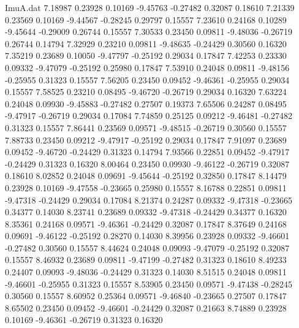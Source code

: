 \begin{filecontents}{ImuA.dat}
   7.18987    0.23928    0.10169   -9.45763   -0.27482    0.32087    0.18610
   7.21339    0.23569    0.10169   -9.44567   -0.28245    0.29797    0.15557
   7.23610    0.24168    0.10289   -9.45644   -0.29009    0.26744    0.15557
   7.30533    0.23450    0.09811   -9.48036   -0.26719    0.26744    0.14794
   7.32929    0.23210    0.09811   -9.48635   -0.24429    0.30560    0.16320
   7.35219    0.23689    0.10050   -9.47797   -0.25192    0.29034    0.17847
   7.42253    0.23330    0.09332   -9.47079   -0.25192    0.25980    0.17847
   7.53910    0.24048    0.09811   -9.48156   -0.25955    0.31323    0.15557
   7.56205    0.23450    0.09452   -9.46361   -0.25955    0.29034    0.15557
   7.58525    0.23210    0.08495   -9.46720   -0.26719    0.29034    0.16320
   7.63224    0.24048    0.09930   -9.45883   -0.27482    0.27507    0.19373
   7.65506    0.24287    0.08495   -9.47917   -0.26719    0.29034    0.17084
   7.74859    0.25125    0.09212   -9.46481   -0.27482    0.31323    0.15557
   7.86441    0.23569    0.09571   -9.48515   -0.26719    0.30560    0.15557
   7.88733    0.23450    0.09212   -9.47917   -0.25192    0.29034    0.17847
   7.91097    0.23689    0.09452   -9.46720   -0.24429    0.31323    0.14794
   7.93566    0.22851    0.09452   -9.47917   -0.24429    0.31323    0.16320
   8.00464    0.23450    0.09930   -9.46122   -0.26719    0.32087    0.18610
   8.02852    0.24048    0.09691   -9.45644   -0.25192    0.32850    0.17847
   8.14479    0.23928    0.10169   -9.47558   -0.23665    0.25980    0.15557
   8.16788    0.22851    0.09811   -9.47318   -0.24429    0.29034    0.17084
   8.21374    0.24287    0.09332   -9.47318   -0.23665    0.34377    0.14030
   8.23741    0.23689    0.09332   -9.47318   -0.24429    0.34377    0.16320
   8.35361    0.24168    0.09571   -9.46361   -0.24429    0.32087    0.17847
   8.37649    0.24168    0.09691   -9.46122   -0.25192    0.28270    0.14030
   8.39956    0.23928    0.09332   -9.46601   -0.27482    0.30560    0.15557
   8.44624    0.24048    0.09093   -9.47079   -0.25192    0.32087    0.15557
   8.46932    0.23689    0.09811   -9.47199   -0.27482    0.31323    0.18610
   8.49233    0.24407    0.09093   -9.48036   -0.24429    0.31323    0.14030
   8.51515    0.24048    0.09811   -9.46601   -0.25955    0.31323    0.15557
   8.53905    0.23450    0.09571   -9.47438   -0.28245    0.30560    0.15557
   8.60952    0.25364    0.09571   -9.46840   -0.23665    0.27507    0.17847
   8.65502    0.23450    0.09452   -9.46601   -0.24429    0.32087    0.21663
   8.74889    0.23928    0.10169   -9.46361   -0.26719    0.31323    0.16320

\end{filecontents}
